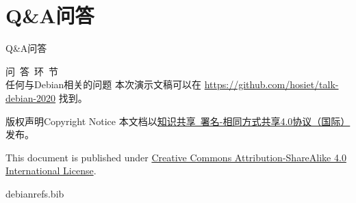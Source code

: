 \documentclass[aspectratio=169]{beamer}
\begin{document}

\section{Q\&A问答}

\begin{frame}{Q\&A}{问答}
\begin{center}
{\Large 问~答~环~节}
\\
任何与Debian相关的问题
\vfill
本次演示文稿可以在 \url{https://github.com/hosiet/talk-debian-2020} 找到。
\end{center}
\end{frame}

\begin{frame}{版权声明}{Copyright Notice}
本文档以\href{https://creativecommons.org/licenses/by-sa/4.0/legalcode}{知识共享~署名-相同方式共享4.0协议（国际）}发布。
\vspace{1em}

This document is published under \href{https://creativecommons.org/licenses/by-sa/4.0/legalcode}{Creative Commons Attribution-ShareAlike 4.0 International License}.
\end{frame}

\begin{filecontents*}{debianrefs.bib}
\end{filecontents*}

\end{document}
